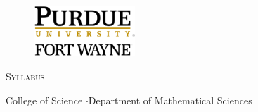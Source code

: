\documentclass[letterpaper,twoside]{article}
\author{\Author}
\title{\DocumentTitle}
\def\BulletPointSeparator{\SmallHSpace$\cdot$\SmallHSpace}
\def\SmallHSpace{\hspace*{1mm}}
\begin{document}
\begin{titlepage}
    \begin{figure}[t]
        \centering
        \includegraphics[width=1.5in]{../Resources/Letterhead.png}
    \end{figure}
    \vspace*{0.5in}
    \begin{center}
        \huge
        \textsc{Syllabus}
        
        \normalsize
        College of Science \BulletPointSeparator Department of Mathematical Sciences


\end{center}
\end{titlepage}
\end{document}
